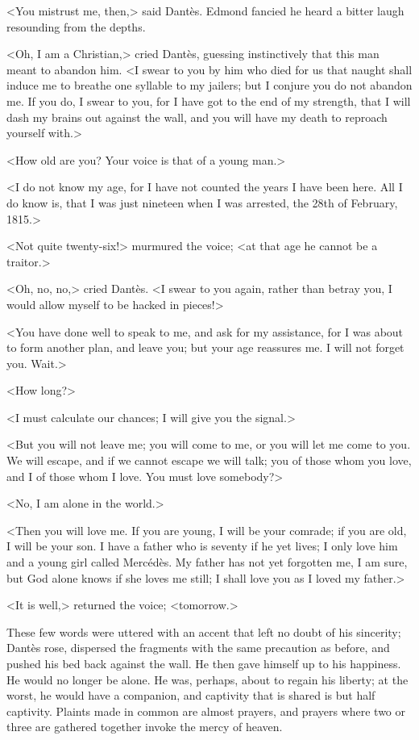  <You mistrust me, then,> said Dantès. Edmond fancied he heard a bitter laugh resounding from the depths. 

 <Oh, I am a Christian,> cried Dantès, guessing instinctively that this man meant to abandon him. <I swear to you by him who died for us that naught shall induce me to breathe one syllable to my jailers; but I conjure you do not abandon me. If you do, I swear to you, for I have got to the end of my strength, that I will dash my brains out against the wall, and you will have my death to reproach yourself with.> 

 <How old are you? Your voice is that of a young man.> 

 <I do not know my age, for I have not counted the years I have been here. All I do know is, that I was just nineteen when I was arrested, the 28th of February, 1815.> 

 <Not quite twenty-six!> murmured the voice; <at that age he cannot be a traitor.> 

 <Oh, no, no,> cried Dantès. <I swear to you again, rather than betray you, I would allow myself to be hacked in pieces!> 

 <You have done well to speak to me, and ask for my assistance, for I was about to form another plan, and leave you; but your age reassures me. I will not forget you. Wait.> 

 <How long?> 

 <I must calculate our chances; I will give you the signal.> 

 <But you will not leave me; you will come to me, or you will let me come to you. We will escape, and if we cannot escape we will talk; you of those whom you love, and I of those whom I love. You must love somebody?> 

 <No, I am alone in the world.> 

 <Then you will love me. If you are young, I will be your comrade; if you are old, I will be your son. I have a father who is seventy if he yet lives; I only love him and a young girl called Mercédès. My father has not yet forgotten me, I am sure, but God alone knows if she loves me still; I shall love you as I loved my father.> 

 <It is well,> returned the voice; <tomorrow.> 

 These few words were uttered with an accent that left no doubt of his sincerity; Dantès rose, dispersed the fragments with the same precaution as before, and pushed his bed back against the wall. He then gave himself up to his happiness. He would no longer be alone. He was, perhaps, about to regain his liberty; at the worst, he would have a companion, and captivity that is shared is but half captivity. Plaints made in common are almost prayers, and prayers where two or three are gathered together invoke the mercy of heaven. 

